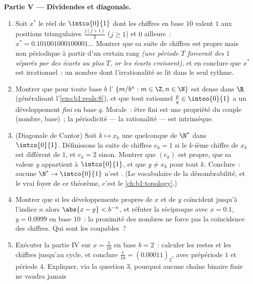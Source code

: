 \begin{problem}
\medskip
\noindent\textbf{Partie V --- Dividendes et diagonale.}
\begin{enumerate}[resume]
  \item Soit $x^*$ le réel de $\intco{0}{1}$ dont les chiffres en
        base $10$ valent $1$ aux positions triangulaires $\frac{j(j
        + 1)}{2}$ ($j \geq 1$) et $0$ ailleurs~: $x^* =
        0.101001000100001\dots$ Montrer que sa suite de chiffres est
        propre mais non périodique à partir d'un certain rang
        \emph{(une période $T$ forcerait des $1$ séparés par des
        écarts au plus $T$, or les écarts croissent)}, et en
        conclure que $x^*$ est irrationnel~: un nombre dont
        l'irrationalité se lit dans le seul rythme.
  \item Montrer que pour toute base $b$ l' $\{m/b^n : m \in
        \Z, n \in \N\}$ est dense dans $\R$ (généralisant
        l'\cref{exo:b1:reals:8}), et que tout rationnel $\frac pq
        \in \intoo{0}{1}$ a un développement \emph{fini} en base
        $q$. Morale~: être fini est une propriété du couple
        (nombre, base)~; la périodicité --- la rationalité --- est
        intrinsèque.
  \item (Diagonale de Cantor) Soit $k \mapsto x_k$ une 
        quelconque de $\N^*$ dans $\intco{0}{1}$. Définissons la
        suite de chiffres $e_k = 1$ si le $k$-ième chiffre de $x_k$
        est différent de $1$, et $e_k = 2$ sinon. Montrer que
        $(e_k)$ est propre, que sa valeur $y$ appartient à
        $\intco{0}{1}$, et que $y \neq x_k$ pour tout $k$. Conclure~:
        aucune  $\N^* \to \intco{0}{1}$ n'est .
        (Le vocabulaire de la dénombrabilité, et le vrai foyer de ce
        théorème, c'est le \cref{ch:b1:topology}.)
  \item Montrer que si les développements propres de $x$ et de $y$
        coïncident jusqu'à l'indice $n$ alors $\abs{x - y} < b^{-n}$,
        et réfuter la réciproque avec $x = 0.1$, $y = 0.0999$ en base
        $10$~: la proximité des nombres ne force pas la coïncidence
        des chiffres. Qui sont les coupables~?
  \item Exécuter la partie IV sur $x = \frac{1}{10}$ en base $b =
        2$~: calculer les restes et les chiffres jusqu'au cycle, et
        conclure $\frac{1}{10} = (0.0\overline{0011})_2$, avec
        prépériode $1$ et période $4$. Expliquer, via la question 3,
        pourquoi aucune chaîne binaire finie ne vaudra jamais

\end{enumerate}
\end{problem}
